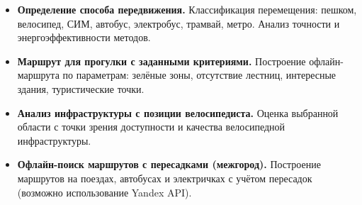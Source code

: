 \documentclass[a4paper,12pt]{article}
\begin{document}
\begin{itemize}
\item \textbf{Определение способа передвижения.}
Классификация перемещения: пешком, велосипед, СИМ, автобус, электробус, трамвай, метро. Анализ точности и энергоэффективности методов.

\item \textbf{Маршрут для прогулки с заданными критериями.}
Построение офлайн-маршрута по параметрам: зелёные зоны, отсутствие лестниц, интересные здания, туристические точки.

\item \textbf{Анализ инфраструктуры с позиции велосипедиста.}
Оценка выбранной области с точки зрения доступности и качества велосипедной инфраструктуры.

\item \textbf{Офлайн-поиск маршрутов с пересадками (межгород).}
Построение маршрутов на поездах, автобусах и электричках с учётом пересадок (возможно использование Yandex API).

\end{itemize}
\end{document}
